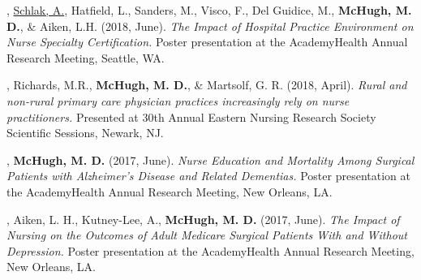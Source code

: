\documentclass[10pt,]{article}
\begin{document}
{{{{{{{{{{{{{{{\vspace{4mm}

\begin{hangparas}{.25in}{1}

, {\underline {Schlak, A.}}, Hatfield, L., Sanders, M., Visco, F., Del Guidice, M., {\textbf {McHugh, M. D.}}, \& Aiken, L.H. (2018, June). {\textit {The Impact of Hospital Practice Environment on Nurse Specialty Certification.}} Poster presentation at the AcademyHealth Annual Research Meeting, Seattle, WA.

\end{hangparas}

\vspace{4mm}

\begin{hangparas}{.25in}{1}

, Richards, M.R., {\textbf {McHugh, M. D.}}, \& Martsolf, G. R. (2018, April). {\textit {Rural and non-rural primary care physician practices increasingly rely on nurse practitioners.}} Presented at 30th Annual Eastern Nursing Research Society Scientific Sessions, Newark, NJ.

\end{hangparas}

\vspace{4mm}

\begin{hangparas}{.25in}{1}

, {\textbf {McHugh, M. D.}} (2017, June). {\textit {Nurse Education and Mortality Among Surgical Patients with Alzheimer’s Disease and Related Dementias.}} Poster presentation at the AcademyHealth Annual Research Meeting, New Orleans, LA.

\end{hangparas}

\vspace{4mm}

\begin{hangparas}{.25in}{1}

, Aiken, L. H., Kutney-Lee, A., {\textbf {McHugh, M. D.}} (2017, June). {\textit {The Impact of Nursing on the Outcomes of Adult Medicare Surgical Patients With and Without Depression.}} Poster presentation at the AcademyHealth Annual Research Meeting, New Orleans, LA.

\end{hangparas}

\vspace{4mm}

}}}}}}}}}}}}}}}
\end{document}
